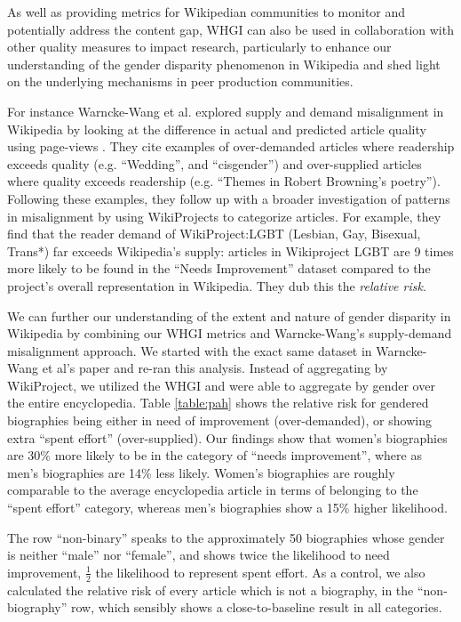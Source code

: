 \documentclass{sig-alternate-05-2015}
\begin{document}
As well as providing metrics for Wikipedian communities to monitor and potentially address the content gap, WHGI can also be used in collaboration with other quality measures to impact research, particularly to enhance our understanding of the gender disparity phenomenon in Wikipedia and shed light on the underlying mechanisms in peer production communities.

 For instance Warncke-Wang et al. explored supply and demand misalignment in Wikipedia by looking at the difference in actual and predicted article quality using page-views \cite{warncke-wang_misalignment_2015}. They cite examples of over-demanded articles where readership exceeds quality (e.g. ``Wedding'', and ``cisgender'') and over-supplied articles where quality exceeds readership (e.g. ``Themes in Robert Browning's poetry''). Following these examples, they follow up with a broader investigation of patterns in misalignment by using WikiProjects to categorize articles. For example, they find that the reader demand of WikiProject:LGBT (Lesbian, Gay, Bisexual, Trans*) far exceeds Wikipedia's supply: articles in Wikiproject LGBT are 9 times more likely to be found in the ``Needs Improvement'' dataset compared to the project's overall representation in Wikipedia. They dub this the \textit{relative risk}\cite{davies_when_1998}.

We can further our understanding of the extent and nature of gender disparity in Wikipedia by combining our WHGI metrics and Warncke-Wang's supply-demand misalignment approach. We started with the exact same dataset in Warncke-Wang et al's paper and re-ran this analysis. Instead of aggregating by WikiProject, we utilized the WHGI and were able to aggregate by gender over the entire encyclopedia. Table \ref{table:pah} shows the relative risk for gendered biographies being either in need of improvement (over-demanded), or showing extra ``spent effort'' (over-supplied). Our findings show that women's biographies are 30\% more likely to be in the category of ``needs improvement'', where as men's biographies are 14\% less likely. Women's biographies are roughly comparable to the average encyclopedia article in terms of belonging to the ``spent effort'' category, whereas men's biographies show a 15\% higher likelihood.

The row ``non-binary'' speaks to the approximately 50 biographies whose gender is neither ``male'' nor ``female'', and shows twice the likelihood to need improvement, $\frac{1}{2}$ the likelihood to represent spent effort. As a control, we also calculated the relative risk of every article which is not a biography, in the ``non-biography'' row, which sensibly shows a close-to-baseline result in all categories. 
\end{document}
